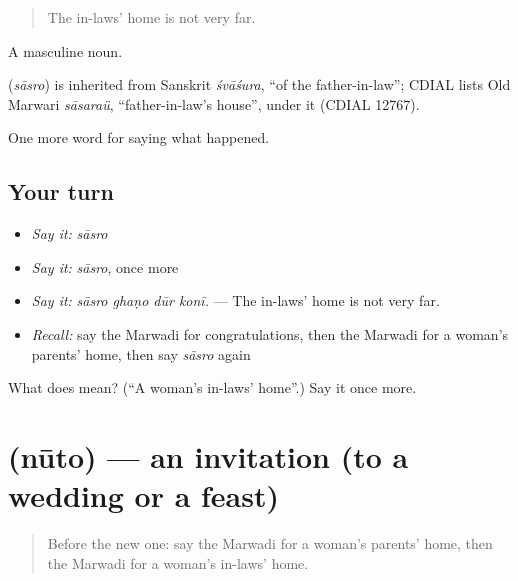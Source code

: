 \begin{quote}
The in-laws' home is not very far.
\end{quote}

A masculine noun.

\begin{cousinweb}
\textbf{} (\emph{sāsro}) is inherited from Sanskrit \emph{śvāśura}, \textquotedblleft{}of the father-in-law\textquotedblright{}; CDIAL lists Old Marwari \emph{sāsaraü}, \textquotedblleft{}father-in-law's house\textquotedblright{}, under it (CDIAL 12767).
\end{cousinweb}

\begin{grammarlens}[title={What you've built}]
One more word for saying what happened.
\end{grammarlens}

\subsection*{Your turn}
\begin{itemize}
\raggedright
  \item \emph{Say it:} \emph{sāsro}
  \item \emph{Say it:} \emph{sāsro}, once more
  \item \emph{Say it:} \emph{sāsro ghaṇo dūr konī.} — The in-laws' home is not very far.
  \item \emph{Recall:} say the Marwadi for congratulations, then the Marwadi for a woman's parents' home, then say \emph{sāsro} again
\end{itemize}

\begin{tcolorbox}[breakable,colback=teal!4,colframe=teal!35!black,title={Before you move on}]
What does  mean? (\textquotedblleft{}A woman's in-laws' home\textquotedblright{}.) Say it once more.
\end{tcolorbox}
\section[\texorpdfstring{\mw{नूतो} (nūto)}{नूतो (nūto)}]{ (nūto) — an invitation (to a wedding or a feast)}

\label{lesson:MW-C246-nuto}



\begin{quote}
Before the new one: say the Marwadi for a woman's parents' home, then the Marwadi for a woman's in-laws' home.
\end{quote}

